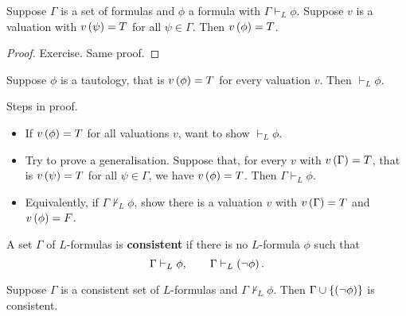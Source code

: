 \begin{theorem}
Suppose $ \Gamma $ is a set of formulas and $ \phi $ a formula with $ \Gamma \vdash_L \phi $. Suppose $ v $ is a valuation with $ v\left( \psi \right) = T $ for all $ \psi \in \Gamma $. Then $ v\left( \phi \right) = T $.
\end{theorem}

\begin{proof}
Exercise. Same proof.
\end{proof}

\pagebreak

\begin{theorem}
\label{thm:1.3.4}
Suppose $ \phi $ is a tautology, that is $ v\left( \phi \right) = T $ for every valuation $ v $. Then $ \vdash_L \phi $.
\end{theorem}

\begin{remark}
Steps in proof.
\begin{itemize}
\item If $ v\left( \phi \right) = T $ for all valuations $ v $, want to show $ \vdash_L \phi $.
\item Try to prove a generalisation. Suppose that, for every $ v $ with $ v\left( \Gamma \right) = T $, that is $ v\left( \psi \right) = T $ for all $ \psi \in \Gamma $, we have $ v\left( \phi \right) = T $. Then $ \Gamma \vdash_L \phi $.
\item Equivalently, if $ \Gamma \not\vdash_L \phi $, show there is a valuation $ v $ with $ v\left( \Gamma \right) = T $ and $ v\left( \phi \right) = F $.
\end{itemize}
\end{remark}

\begin{definition}
A set $ \Gamma $ of $ L $-formulas is \textbf{consistent} if there is no $ L $-formula $ \phi $ such that
$$ \Gamma \vdash_L \phi, \qquad \Gamma \vdash_L \left( \neg \phi \right). $$
\end{definition}

\begin{proposition}
\label{prop:1.3.7}
Suppose $ \Gamma $ is a consistent set of $ L $-formulas and $ \Gamma \not\vdash_L \phi $. Then $ \Gamma \cup \left\{ \left( \neg \phi \right) \right\} $ is consistent.
\end{proposition}

